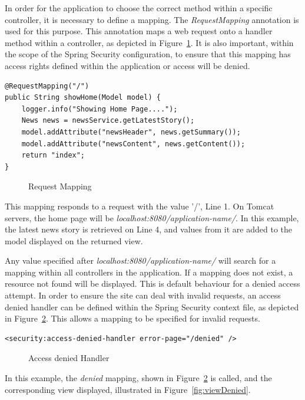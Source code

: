 In order for the application to choose the correct method within a specific controller, it is necessary to define a mapping. The \textit{RequestMapping} annotation is used for this purpose. This annotation maps a web request onto a handler method within a controller, as depicted in Figure~\ref{fig:requestmapping}. It is also important, within the scope of the Spring Security configuration, to ensure that this mapping has access rights defined within the application or access will be denied.

\begin{lstlisting}
@RequestMapping("/")
public String showHome(Model model) {
	logger.info("Showing Home Page....");
	News news = newsService.getLatestStory();
	model.addAttribute("newsHeader", news.getSummary());
	model.addAttribute("newsContent", news.getContent());
	return "index";
}
\end{lstlisting}
\begin{figure}[H]
\caption{Request Mapping}
\label{fig:requestmapping}
\end{figure}

This mapping responds to a request with the value '/', Line 1. On Tomcat servers, the home page will be \textit{localhost:8080/application-name/}. In this example, the latest news story is retrieved on Line 4, and values from it are added to the model displayed on the returned view.

Any value specified after \textit{localhost:8080/application-name/} will search for a mapping within all controllers in the application. If a mapping does not exist, a resource not found will be displayed. This is default behaviour for a denied access attempt. In order to ensure the site can deal with invalid requests, an access denied handler can be defined within the Spring Security context file, as depicted in Figure~\ref{fig:accessDenied}. This allows a mapping to be specified for invalid requests.

\begin{lstlisting}
<security:access-denied-handler error-page="/denied" />
\end{lstlisting}
\begin{figure}[H]
\caption{Access denied Handler}
\label{fig:accessDenied}
\end{figure}

In this example, the \textit{denied} mapping, shown in Figure~\ref{fig:accessDenied} is called, and the corresponding view displayed, illustrated in Figure~\ref{fig:viewDenied}. 

